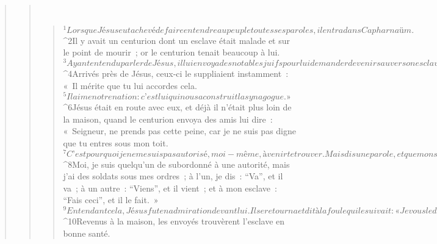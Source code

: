 \begin{verse}
\begin{verse}
         
      \bchapter{}
      \begin{verse}
${}^{1}Lorsque Jésus eut achevé de faire entendre au peuple toutes ses paroles, il entra dans Capharnaüm. 
${}^{2}Il y avait un centurion dont un esclave était malade et sur le point de mourir ; or le centurion tenait beaucoup à lui. 
${}^{3}Ayant entendu parler de Jésus, il lui envoya des notables juifs pour lui demander de venir sauver son esclave. 
${}^{4}Arrivés près de Jésus, ceux-ci le suppliaient instamment : « Il mérite que tu lui accordes cela. 
${}^{5}Il aime notre nation : c’est lui qui nous a construit la synagogue. » 
${}^{6}Jésus était en route avec eux, et déjà il n’était plus loin de la maison, quand le centurion envoya des amis lui dire : « Seigneur, ne prends pas cette peine, car je ne suis pas digne que tu entres sous mon toit. 
${}^{7}C’est pourquoi je ne me suis pas autorisé, moi-même, à venir te trouver. Mais dis une parole, et que mon serviteur soit guéri ! 
${}^{8}Moi, je suis quelqu’un de subordonné à une autorité, mais j’ai des soldats sous mes ordres ; à l’un, je dis : “Va”, et il va ; à un autre : “Viens”, et il vient ; et à mon esclave : “Fais ceci”, et il le fait. » 
${}^{9}Entendant cela, Jésus fut en admiration devant lui. Il se retourna et dit à la foule qui le suivait : « Je vous le déclare, même en Israël, je n’ai pas trouvé une telle foi ! » 
${}^{10}Revenus à la maison, les envoyés trouvèrent l’esclave en bonne santé.
      

\end{verse}
\end{verse}
\end{verse}
